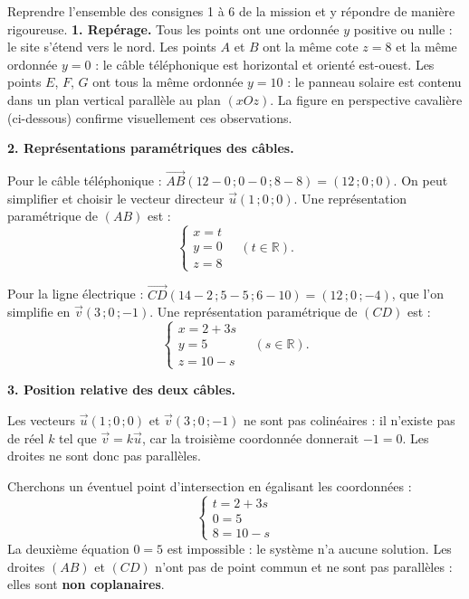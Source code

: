 \documentclass[11pt]{article}
\begin{document}
\begin{exoresolu}
Reprendre l'ensemble des consignes 1 à 6 de la mission et y répondre de manière rigoureuse.
\tcblower
\textbf{1. Repérage.} Tous les points ont une ordonnée $y$ positive ou nulle : le site s'étend vers le nord. Les points $A$ et $B$ ont la même cote $z = 8$ et la même ordonnée $y = 0$ : le câble téléphonique est horizontal et orienté est-ouest. Les points $E$, $F$, $G$ ont tous la même ordonnée $y = 10$ : le panneau solaire est contenu dans un plan vertical parallèle au plan $(xOz)$. La figure en perspective cavalière (ci-dessous) confirme visuellement ces observations.

\textbf{2. Représentations paramétriques des câbles.}

Pour le câble téléphonique : $\overrightarrow{AB}(12-0\,;0-0\,;8-8) = (12\,;0\,;0)$. On peut simplifier et choisir le vecteur directeur $\vec{u}(1\,;0\,;0)$. Une représentation paramétrique de $(AB)$ est :
\[
\begin{cases} x = t \\ y = 0 \\ z = 8 \end{cases} \quad (t \in \mathbb{R}).
\]

Pour la ligne électrique : $\overrightarrow{CD}(14-2\,;5-5\,;6-10) = (12\,;0\,;-4)$, que l'on simplifie en $\vec{v}(3\,;0\,;-1)$. Une représentation paramétrique de $(CD)$ est :
\[
\begin{cases} x = 2 + 3s \\ y = 5 \\ z = 10 - s \end{cases} \quad (s \in \mathbb{R}).
\]

\textbf{3. Position relative des deux câbles.}

Les vecteurs $\vec{u}(1\,;0\,;0)$ et $\vec{v}(3\,;0\,;-1)$ ne sont pas colinéaires : il n'existe pas de réel $k$ tel que $\vec{v} = k\vec{u}$, car la troisième coordonnée donnerait $-1 = 0$. Les droites ne sont donc pas parallèles.

Cherchons un éventuel point d'intersection en égalisant les coordonnées :
\[
\begin{cases} t = 2 + 3s \\ 0 = 5 \\ 8 = 10 - s \end{cases}
\]
La deuxième équation $0 = 5$ est impossible : le système n'a aucune solution. Les droites $(AB)$ et $(CD)$ n'ont pas de point commun et ne sont pas parallèles : elles sont \textbf{non coplanaires}.


\end{exoresolu}
\end{document}
